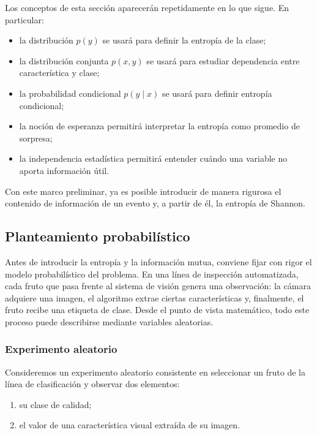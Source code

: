 \documentclass{article}
\begin{document}
Los conceptos de esta sección aparecerán repetidamente en lo que sigue. En particular:

\begin{itemize}
\item la distribución \(p(y)\) se usará para definir la entropía de la clase;
\item la distribución conjunta \(p(x,y)\) se usará para estudiar dependencia entre característica y clase;
\item la probabilidad condicional \(p(y\mid x)\) se usará para definir entropía condicional;
\item la noción de esperanza permitirá interpretar la entropía como promedio de sorpresa;
\item la independencia estadística permitirá entender cuándo una variable no aporta información útil.
\end{itemize}

Con este marco preliminar, ya es posible introducir de manera rigurosa el contenido de información de un evento y, a partir de él, la entropía de Shannon.

\subsection{Planteamiento probabilístico}

Antes de introducir la entropía y la información mutua, conviene fijar con rigor el modelo probabilístico del problema. En una línea de inspección automatizada, cada fruto que pasa frente al sistema de visión genera una observación: la cámara adquiere una imagen, el algoritmo extrae ciertas características y, finalmente, el fruto recibe una etiqueta de clase. Desde el punto de vista matemático, todo este proceso puede describirse mediante variables aleatorias.

\subsubsection*{Experimento aleatorio}

Consideremos un experimento aleatorio consistente en seleccionar un fruto de la línea de clasificación y observar dos elementos:

\begin{enumerate}
\item su clase de calidad;
\item el valor de una característica visual extraída de su imagen.
\end{enumerate}
\end{document}
